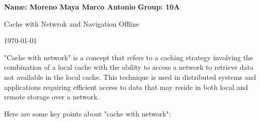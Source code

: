 \documentclass{article}
\begin{document}
\begin{titlepage}
    \centering
    \vspace*{2cm}
    
    \vspace{2cm}
    
    \textbf{Name: Moreno Maya Marco Antonio} {\hspace{5cm}} 
    \vspace{1cm}
    \textbf{Group: 10A} {\hspace{5cm}} \\
    
    \vfill
    
    \vspace{0.5cm}
    Cache with Netwrok and Navigation Offline

    
    \vspace{1cm}
    
    
    \vspace{1cm}
    
    \today %
    
\end{titlepage}


"Cache with network" is a concept that refers to a caching strategy involving the combination of a local cache with the ability to access a network to retrieve data not available in the local cache. This technique is used in distributed systems and applications requiring efficient access to data that may reside in both local and remote storage over a network.

Here are some key points about "cache with network":
\end{document}
